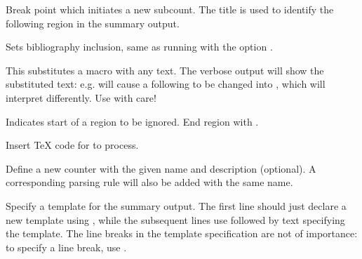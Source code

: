 
\begin{description}

Break point which initiates a new subcount. The title is used to identify the following region in the summary output.

Sets bibliography inclusion, same as running \TeXcount{} with the option .

This substitutes a macro with any text. The verbose output will show the substituted text: e.g.  will cause a following  to be changed into , which \TeXcount{} will interpret differently. Use with care!

\option[ignore]
Indicates start of a region to be ignored. End region with .

Insert \TeX{} code for \TeXcount{} to process.

Define a new counter with the given name and description (optional). A corresponding parsing rule will also be added with the same name.

Specify a template for the summary output. The first line should just declare a new template using , while the subsequent lines use  followed by text specifying the template. The line breaks in the template specification are not of importance: to specify a line break, use .

\end{description}
